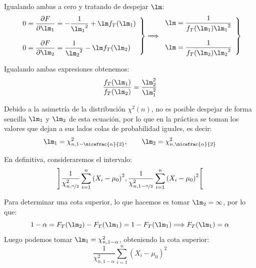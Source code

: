 \begin{ejercicio}
    Igualando ambas a cero y tratando de despejar $\lm$:
    \begin{equation*}
        \left.\begin{array}{l}
            0 = \dfrac{\partial F}{\partial \lm_1} = -\dfrac{1}{{\lm_1}^2} + \lm f_T(\lm_1) \\ \\
            0 = \dfrac{\partial F}{\partial \lm_2} = \dfrac{1}{{\lm_2}^2} - \lm f_T(\lm_2)
        \end{array}\right\} \Longrightarrow \left.\begin{array}{l}
            \lm = \dfrac{1}{f_T(\lm_1){\lm_1}^2} \\ \\
            \lm = \dfrac{1}{f_T(\lm_2){\lm_2}^2}
        \end{array}\right\}
    \end{equation*}

    Igualando ambas expresiones obtenemos:
    \begin{equation*}
        \frac{f_T(\lm_1)}{f_T(\lm_2)} = \frac{\lm_2^2}{\lm_1^2}
    \end{equation*}

    Debido a la asimetría de la distribución $\chi^2(n)$, no es posible despejar de forma sencilla $\lm_1$ y $\lm_2$ de esta ecuación, por lo que en la práctica se toman los valores que dejan a sus lados colas de probabilidad iguales, es decir:
    \begin{equation*}
        \lm_1 = \chi^2_{n,1-\nicefrac{\alpha}{2}}, \qquad \lm_2 = \chi^2_{n,\nicefrac{\alpha}{2}}
    \end{equation*}
    
    En definitiva, consideraremos el intervalo:
    \begin{equation*}
        \left]\frac{1}{\chi^2_{n,\nicefrac{\alpha}{2}}}\sum\limits_{i=1}^n{(X_i-\mu_0)}^{2},\frac{1}{\chi^2_{n,1-\nicefrac{\alpha}{2}}}\sum\limits_{i=1}^n{(X_i-\mu_0)}^{2} \right[
    \end{equation*}

    Para determinar una cota superior, lo que hacemos es tomar $\lm_2 = \infty$, por lo que:
    \begin{equation*}
        1-\alpha = F_T(\lm_2)-F_T(\lm_1) = 1-F_T(\lm_1) \Longrightarrow F_T(\lm_1) = \alpha
    \end{equation*}
    Luego podemos tomar $\lm_1 = \chi^2_{n,1-\alpha}$, obteniendo la cota superior:
    \begin{equation*}
        \frac{1}{\chi^2_{n,1-\alpha}}\sum\limits_{i=1}^n{(X_i-\mu_0)}^{2} 
    \end{equation*}


\end{ejercicio}
